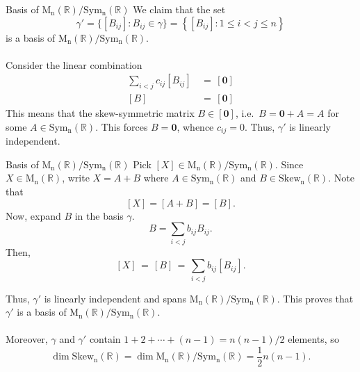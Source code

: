 \documentclass[handout]{beamer}
\def\dim{\operatorname{dim}}
\def\MnR{\operatorname{M_n(\mathbb{R})}}
\def\Sym{\operatorname{Sym_n(\mathbb{R})}}
\def\Skew{\operatorname{Skew_n(\mathbb{R})}}
\begin{document}
        \begin{frame}{Basis of $\MnR/\Sym$}
                We claim that the set 
                \[
                        \gamma' = \{[B_{ij}]\colon B_{ij} \in \gamma\} = \left\{[B_{ij}]\colon 1 \leq i < j \leq n\right\}
                \]
                is a basis of $\MnR/\Sym$. \\~\\
                \pause
                Consider the linear combination
                \begin{align*}
                        \sum_{i < j} c_{ij} [B_{ij}] \,&=\, [\mathbf{0}] \\
                        [B] \,&=\, [\mathbf{0}]
                \end{align*}
                This means that the skew-symmetric matrix $B \in [\mathbf{0}]$, i.e.\ $B = \mathbf{0} + A = A$ for some $A \in \Sym$.
                This forces $B = \mathbf{0}$, whence $c_{ij} = 0$. Thus, $\gamma'$ is linearly independent.
        \end{frame}

        \begin{frame}{Basis of $\MnR/\Sym$}
                Pick $[X] \in \MnR/\Sym$. Since $X \in \MnR$, write $X = A + B$ where $A \in \Sym$ and $B \in \Skew$. Note that
                \[
                        [X] = [A + B] = [B].
                \]
                \pause
                Now, expand $B$ in the basis $\gamma$.
                \[
                        B = \sum_{i < j} b_{ij} B_{ij}.
                \]
                Then,
                \[
                        [X] \,=\, [B] \,=\, \sum_{i < j} b_{ij} [B_{ij}].
                \]
        \end{frame}

        \begin{frame}
                Thus, $\gamma'$ is linearly independent and spans $\MnR/\Sym$. This proves that $\gamma'$ is a basis of $\MnR/\Sym$. \\~\\

                Moreover, $\gamma$ and $\gamma'$ contain $1 + 2 + \cdots + (n - 1) = n(n - 1)/2$ elements, so
                \[
                        \dim{\Skew} = \dim{\MnR/\Sym} = \frac{1}{2}n(n - 1).
                \]
        \end{frame}
\end{document}
